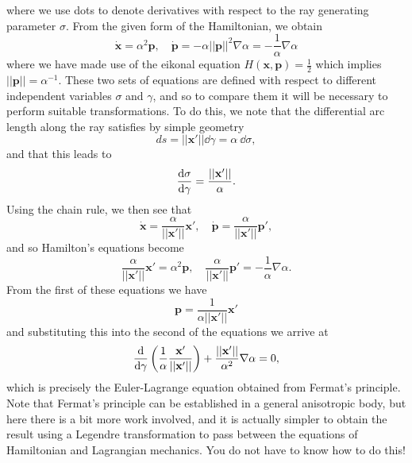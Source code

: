 \documentclass[a4paper,10pt]{paper}
\begin{document}
\begin{enumerate}
\begin{equation*}
\end{equation*}
where we use dots to denote derivatives with respect to the ray generating parameter $\sigma$. From the given form of the Hamiltonian, we obtain
\begin{equation*}
    \dot{\mathbf{x}}=\alpha^{2}\mathbf{p}, \quad \dot{\mathbf{p}}=-\alpha||\mathbf{p}||^2 \nabla\alpha = -\frac{1}{\alpha}\nabla\alpha
\end{equation*}
where we have made use of the eikonal equation $H(\mathbf{x},\mathbf{p})=\frac{1}{2}$ which implies $||\mathbf{p}||=\alpha^{-1}$. These two sets of equations are defined with respect to different independent variables $\sigma$ and $\gamma$, and so to compare them it will be necessary to perform suitable transformations. To do this, we note that the differential arc length along the ray satisfies by simple geometry
\begin{equation*}
    ds=||\mathbf{x}'||\dd\gamma=\alpha~\dd\sigma,
\end{equation*}
and that this leads to
\begin{equation*}
    \frac{\mathrm{d}\sigma}{\mathrm{d}\gamma}=\frac{||\mathbf{x}'||}{\alpha}.
\end{equation*}
Using the chain rule, we then see that
\begin{equation*}
    \dot{\mathbf{x}}=\frac{\alpha}{||\mathbf{x}'||}\mathbf{x}', \quad \dot{\mathbf{p}}=\frac{\alpha}{||\mathbf{x}'||}\mathbf{p}',
\end{equation*}
and so Hamilton's equations become
\begin{equation*}
    \frac{\alpha}{||\mathbf{x}'||}\mathbf{x}'=\alpha^{2}\mathbf{p}, \quad \frac{\alpha}{||\mathbf{x}'||}\mathbf{p}'=-\frac{1}{\alpha}\nabla\alpha.
\end{equation*}
From the first of these equations we have
\begin{equation*}
    \mathbf{p}=\frac{1}{\alpha||\mathbf{x}'||}\mathbf{x}'
\end{equation*}
and substituting this into the second of the equations we arrive at
\begin{equation*}
    \frac{\mathrm{d}}{\mathrm{d}\gamma}\left(\frac{1}{\alpha}\frac{\mathbf{x}'}{||\mathbf{x}'||}\right)+\frac{||\mathbf{x}'||}{\alpha^{2}}\nabla\alpha=0,
\end{equation*}
which is precisely the Euler-Lagrange equation obtained from Fermat's principle. Note that Fermat's principle can be established in a general anisotropic body, but here there is a bit more work involved, and it is actually simpler to obtain the result using a Legendre transformation to pass between the equations of Hamiltonian and Lagrangian mechanics. You do not have to know how to do this!




\end{enumerate}
\end{document}
